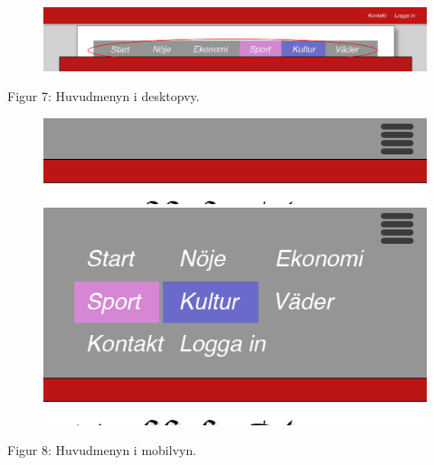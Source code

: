 \documentclass[11pt]{article}
\begin{document}
\begin{figure}[H]
\centerline{%
\includegraphics[scale=0.4]{pics/menydesktop.png}\\
}
\end{figure}
\hspace{0.5cm}Figur 7: Huvudmenyn i desktopvy.

\begin{figure}[H]
\centerline{%
\includegraphics[scale=0.6]{pics/menymobil.png}\hspace{2em}%
\includegraphics[scale=0.35]{pics/menymobilopen.png}%
}
\end{figure}
\hspace{0.5cm}Figur 8: Huvudmenyn i mobilvyn.
\end{document}
